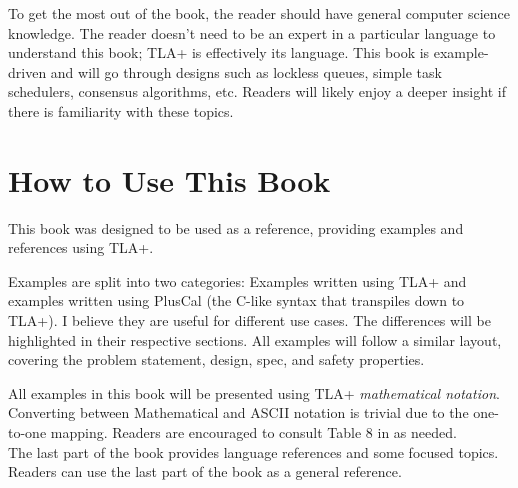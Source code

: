 To get the most out of the book, the reader should have general computer
science knowledge. The reader doesn't need to be an expert in a particular
language to understand this book; TLA+ is effectively its language. This book is
example-driven and will go through designs such as lockless queues, simple
task schedulers, consensus algorithms, etc. Readers will likely enjoy a deeper
insight if there is familiarity with these topics.

\section{How to Use This Book}

This book was designed to be used as a reference, providing examples
and references using TLA+.\newline

Examples are split into two categories: Examples written using TLA+ and
examples written using PlusCal (the C-like syntax that transpiles down to TLA+).
I believe they are useful for different use cases. The differences will
be highlighted in their respective sections. All examples will follow a
similar layout, covering the problem statement, design, spec, and safety
properties.\newline

All examples in this book will be presented using TLA+ \textit{mathematical
notation}. Converting between Mathematical and ASCII notation is trivial due to
the one-to-one mapping. Readers are encouraged to consult Table 8 in \cite{ss}
as needed.\\

The last part of the book provides language references and some focused topics.
Readers can use the last part of the book as a general reference. 
